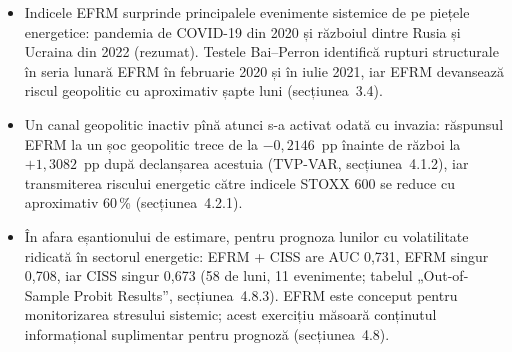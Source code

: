 \textbf{}
\begin{itemize}
\item {}%
{Indicele EFRM surprinde principalele evenimente sistemice de pe piețele energetice: pandemia de COVID-19 din 2020 și războiul dintre Rusia și Ucraina din 2022 (rezumat).
Testele Bai--Perron identifică rupturi structurale în seria lunară EFRM în februarie 2020 și în iulie 2021, iar EFRM devansează riscul geopolitic cu aproximativ șapte luni (secțiunea~3.4).}
\item {}%
{Un canal geopolitic inactiv pînă atunci s-a activat odată cu invazia: răspunsul EFRM la un șoc geopolitic trece de la $-0{,}2146$~pp înainte de război la $+1{,}3082$~pp după declanșarea acestuia (TVP-VAR, secțiunea~4.1.2), iar transmiterea riscului energetic către indicele STOXX 600 se reduce cu aproximativ 60\,\% (secțiunea~4.2.1).}
\item {}%
{În afara eșantionului de estimare, pentru prognoza lunilor cu volatilitate ridicată în sectorul energetic: EFRM + CISS are AUC 0,731, EFRM singur 0,708, iar CISS singur 0,673 (58 de luni, 11 evenimente; tabelul „Out-of-Sample Probit Results”, secțiunea~4.8.3).
EFRM este conceput pentru monitorizarea stresului sistemic; acest exercițiu măsoară conținutul informațional suplimentar pentru prognoză (secțiunea~4.8).}
\end{itemize}

